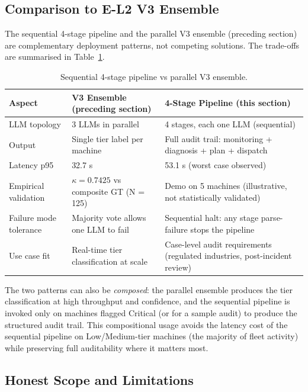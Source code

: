 \subsection{Comparison to E-L2 V3 Ensemble}

The sequential 4-stage pipeline and the parallel V3 ensemble (preceding section) are complementary deployment patterns, not competing solutions. The trade-offs are summarised in Table~\ref{tab:multi_agent_vs_ensemble}.

\begin{table}[h!]
\centering
\caption{Sequential 4-stage pipeline vs parallel V3 ensemble.}
\label{tab:multi_agent_vs_ensemble}
\begin{tabular}{p{4cm}p{4.5cm}p{5cm}}
\hline
\textbf{Aspect} & \textbf{V3 Ensemble (preceding section)} & \textbf{4-Stage Pipeline (this section)} \\
\hline
LLM topology & 3 LLMs in parallel & 4 stages, each one LLM (sequential) \\
Output & Single tier label per machine & Full audit trail: monitoring + diagnosis + plan + dispatch \\
Latency p95 & 32.7 s & 53.1 s (worst case observed) \\
Empirical validation & $\kappa = 0.7425$ vs composite GT (N = 125) & Demo on 5 machines (illustrative, not statistically validated) \\
Failure mode tolerance & Majority vote allows one LLM to fail & Sequential halt: any stage parse-failure stops the pipeline \\
Use case fit & Real-time tier classification at scale & Case-level audit requirements (regulated industries, post-incident review) \\
\hline
\end{tabular}
\end{table}

The two patterns can also be \emph{composed}: the parallel ensemble produces the tier classification at high throughput and confidence, and the sequential pipeline is invoked only on machines flagged Critical (or for a sample audit) to produce the structured audit trail. This compositional usage avoids the latency cost of the sequential pipeline on Low/Medium-tier machines (the majority of fleet activity) while preserving full auditability where it matters most.

\subsection{Honest Scope and Limitations}

